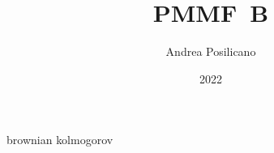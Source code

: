 \usepackage	{style}

\title	{PMMF~B}
\author	{Andrea Posilicano}
\date	{2022}


\maketitle
	{brownian}
\appendix
	{kolmogorov}

